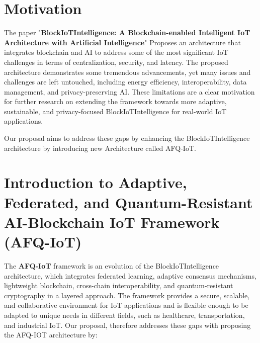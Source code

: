 \documentclass[12pt, oneside]{report}
\begin{document}
\section{Motivation}
The paper "\textbf{BlockIoTIntelligence: A Blockchain-enabled Intelligent IoT Architecture with Artificial Intelligence}" Proposes an architecture that integrates blockchain and AI to address some of the most significant IoT challenges in terms of centralization, security, and latency. The proposed architecture demonstrates some tremendous advancements, yet many issues and challenges are left untouched, including energy efficiency, interoperability, data management, and privacy-preserving AI. These limitations are a clear motivation for further research on extending the framework towards more adaptive, sustainable, and privacy-focused BlockIoTIntelligence for real-world IoT applications.

Our proposal aims to address these gaps by enhancing the BlockIoTIntelligence architecture by introducing new Architecture called AFQ-IoT.

\section{Introduction to Adaptive, Federated, and Quantum-Resistant AI-Blockchain IoT Framework (AFQ-IoT)}
The \textbf{AFQ-IoT} framework is an evolution of the BlockIoTIntelligence architecture, which integrates federated learning, adaptive consensus mechanisms, lightweight blockchain, cross-chain interoperability, and quantum-resistant cryptography in a layered approach. The framework provides a secure, scalable, and collaborative environment for IoT applications and is flexible enough to be adapted to unique needs in different fields, such as healthcare, transportation, and industrial IoT.
Our proposal, therefore addresses these gaps with proposing the AFQ-IOT architecture by:
\end{document}
